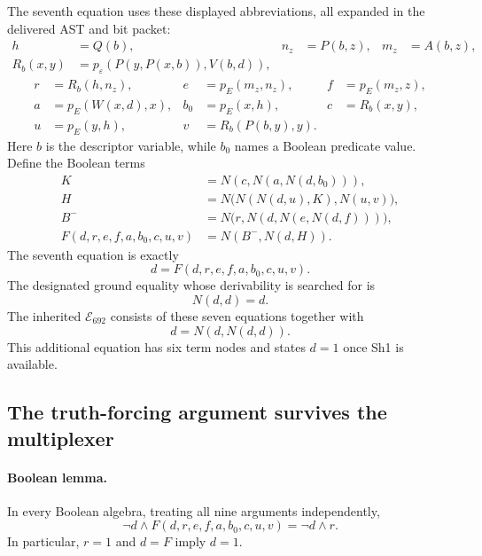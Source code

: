 The seventh equation uses these displayed abbreviations, all expanded
in the delivered AST and bit packet:
\begin{align*}
 h&=Q(b),& n_z&=P(b,z),&m_z&=A(b,z),\\
 R_b(x,y)&=p_\varepsilon(P(y,P(x,b)),V(b,d)),&&&
\end{align*}
\begin{align*}
 r&=R_b(h,n_z),& e&=p_E(m_z,n_z),&f&=p_E(m_z,z),\\
 a&=p_E(W(x,d),x),& b_0&=p_E(x,h),&c&=R_b(x,y),\\
 u&=p_E(y,h),&v&=R_b(P(b,y),y).&&
\end{align*}
Here $b$ is the descriptor variable, while $b_0$ names a Boolean
predicate value.  Define the Boolean terms
\begin{align*}
 K&=N(c,N(a,N(d,b_0))),\\
 H&=N\bigl(N(N(d,u),K),N(u,v)\bigr),\\
 B^-&=N\bigl(r,N(d,N(e,N(d,f)))\bigr),\\
 F(d,r,e,f,a,b_0,c,u,v)&=N(B^-,N(d,H)).
\end{align*}
The seventh equation is exactly
\begin{equation}
             d=F(d,r,e,f,a,b_0,c,u,v).
 \label{eq:e667-closure}
\end{equation}
The designated ground equality whose derivability is searched for is
\begin{equation}
                         N(d,d)=d.
 \label{eq:e667-query}
\end{equation}
The inherited $\mathcal E_{692}$ consists of these seven equations
together with
\begin{equation}
                         d=N(d,N(d,d)).
 \label{eq:e667-deleted}
\end{equation}
This additional equation has six term nodes and states $d=1$ once
Sh1 is available.

\subsection{The truth-forcing argument survives the multiplexer}

\paragraph{Boolean lemma.}
In every Boolean algebra, treating all nine arguments independently,
\begin{equation}
 \neg d\wedge F(d,r,e,f,a,b_0,c,u,v)=\neg d\wedge r.
 \label{eq:e667-cofactor}
\end{equation}
In particular, $r=1$ and $d=F$ imply $d=1$.

